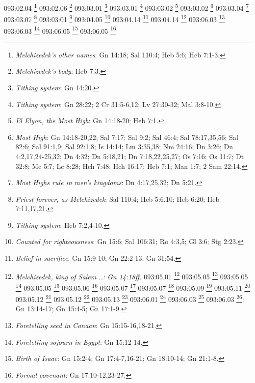 {{{{{{{{{{{{{{{{{093:02.04 \footnote{\textit{Melchizedek's other names}: Gn 14:18; Sal 110:4; Heb 5:6; Heb 7:1-3.}
093:02.06 \footnote{\textit{Melchizedek's body}: Heb 7:3.}
093:03.01 \footnote{\textit{Tithing system}: Gn 14:20.}
093:03.01 \footnote{\textit{Tithing system}: Gn 28:22; 2 Cr 31:5-6,12; Lv 27:30-32; Mal 3:8-10.}
093:03.02 \footnote{\textit{El Elyon, the Most High}: Gn 14:18-20; Heb 7:1.}
093:03.02 \footnote{\textit{Most High}: Gn 14:18-20,22; Sal 7:17; Sal 9:2; Sal 46:4; Sal 78:17,35,56; Sal 82:6; Sal 91:1,9; Sal 92:1,8; Is 14:14; Lm 3:35,38; Nm 24:16; Dn 3:26; Dn 4:2,17,24-25,32; Dn 4:32; Dn 5:18,21; Dn 7:18,22,25,27; Os 7:16; Os 11:7; Dt 32:8; Mc 5:7; Lc 8:28; Hch 7:48; Hch 16:17; Heb 7:1; Man 1:7; 2 Sam 22:14.}
093:03.04 \footnote{\textit{Most Highs rule in men's kingdoms}: Dn 4:17,25,32; Dn 5:21.}
093:03.07 \footnote{\textit{Priest forever, as Melchizedek}: Sal 110:4; Heb 5:6,10; Heb 6:20; Heb 7:11,17,21.}
093:03:01 \footnote{\textit{Tithing system}: Heb 7:2,4-10.}
093:04.05 \footnote{\textit{Counted for righteousness}: Gn 15:6; Sal 106:31; Ro 4:3,5; Gl 3:6; Stg 2:23.}
093:04.14 \footnote{\textit{Belief in sacrifice}: Gn 15:9-10; Gn 22:2-13; Gn 31:54.}
093:04.14 \footnote{\textit{Melchizedek, king of Salem ..: Gn 14:18ff.}
093:05.01 \footnote{\textit{Chosen people}: 1 Re 3:8; 1 Cr 17:21-22; Sal 33:12; Sal 105:6,43; Sal 135:4; Is 41:8-9; Is 43:20-21; Is 44:1; Dt 7:6; Dt 14:2.}
093:05.05 \footnote{\textit{Come to Salem, hear truth}: Gn 12:1-2.}
093:05.05 \footnote{\textit{Death of Terah}: Gn 11:32.}
093:05.05 \footnote{\textit{Lot & Abram to Salem}: Gn 12:4-5.}
093:05.06 \footnote{\textit{Abram arrives}: Gn 12:8.}
093:05.07 \footnote{\textit{Good relationship}: Gn 12:16; Gn 13:1-2.}
093:05.07 \footnote{\textit{Trip to Egypt}: Gn 12:10.}
093:05.09 \footnote{\textit{Lot to Sodom}: Gn 13:5-12.}
093:05.11 \footnote{\textit{Abram to Hebron}: Gn 13:18.}
093:05.12 \footnote{\textit{Abram routs Kings}: Gn 14:13-16.}
093:05.12 \footnote{\textit{Kings capture Lot}: Gn 14:8-12.}
093:05.13 \footnote{\textit{Abram tithes to Melchizedek}: Gn 14:18-20; Heb 7:2.}
093:06.01 \footnote{\textit{Concerned about heir}: Gn 15:1-3.}
093:06.03 \footnote{\textit{Belief counted as righteousness}: Gn 15:6.}
093:06.03 \footnote{\textit{Covenant}: look up to stars}: Gn 13:14-17; Gn 15:4-5; Gn 17:1-9.}
093:06.03 \footnote{\textit{Foretelling seed in Canaan}: Gn 15:15-16,18-21.}
093:06.03 \footnote{\textit{Foretelling sojourn in Egypt}: Gn 15:12-14.}
093:06.05 \footnote{\textit{Birth of Isaac}: Gn 15:2-4; Gn 17:4-7,16-21; Gn 18:10-14; Gn 21:1-8.}
093:06.05 \footnote{\textit{Formal covenant}: Gn 17:10-12,23-27.}
}}}}}}}}}}}}}}}}}
